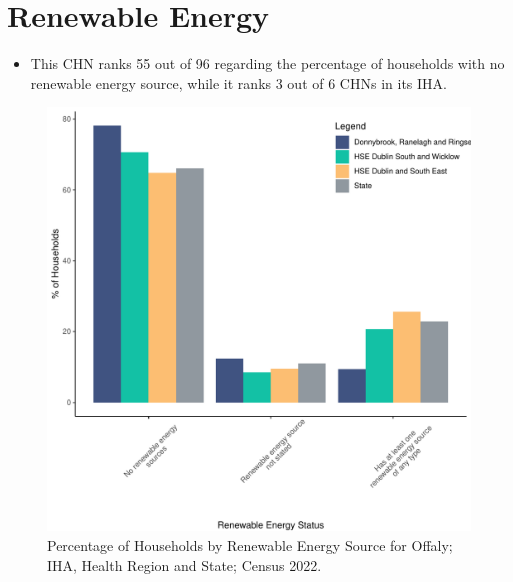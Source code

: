\documentclass{article}
\begin{document}
\section{Renewable Energy}\label{sect:RE}
\begin{itemize}
\item This CHN ranks  55 out of 96 regarding the percentage of households with no renewable energy source, while it ranks   3 out of 6 CHNs in its IHA.
\end{itemize}
\begin{figure}[H]
	\centering
	\includegraphics[width = 140mm]{../figures/RenewableEnergyED.pdf}
	\caption{Percentage of Households by Renewable Energy Source for Offaly; IHA, Health Region and State; Census 2022.}
	\label{fig:vbnv}
	\end{figure}
\end{document}
